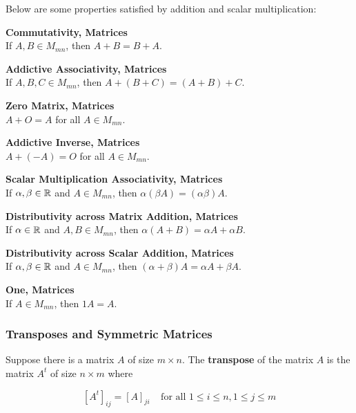 \documentclass[a4paper,12pt]{article}
\begin{document}
\begin{pst}
  Below are some properties satisfied by addition and scalar multiplication:

  \begin{alist}
    \item \textbf{Commutativity, Matrices}\\
    If $A,B\in M_{mn}$, then $A+B=B+A$.

    \item \textbf{Addictive Associativity, Matrices}\\
    If $A,B,C\in M_{mn}$, then $A+(B+C)=(A+B)+C$.

    \item \textbf{Zero Matrix, Matrices}\\
    $A+O=A$ for all $A\in M_{mn}$.

    \item \textbf{Addictive Inverse, Matrices}\\
    $A+(-A)=O$ for all $A\in M_{mn}$.

    \item \textbf{Scalar Multiplication Associativity, Matrices}\\
    If $\alpha,\beta\in\mathbb{R}$ and $A\in M_{mn}$, then $\alpha(\beta A)=(\alpha\beta)A$.

    \item \textbf{Distributivity across Matrix Addition, Matrices}\\
    If $\alpha\in\mathbb{R}$ and $A,B\in M_{mn}$, then $\alpha(A+B)=\alpha A+\alpha B$.

    \item \textbf{Distributivity across Scalar Addition, Matrices}\\
    If $\alpha,\beta\in\mathbb{R}$ and $A\in M_{mn}$, then $(\alpha+\beta)A=\alpha A+\beta A$.

    \item \textbf{One, Matrices}\\
    If $A\in M_{mn}$, then $1A=A$.
  \end{alist}
\end{pst}

\subsubsection{Transposes and Symmetric Matrices}
Suppose there is a matrix $A$ of size $m\times n$. The \textbf{transpose} of the matrix $A$ is the matrix $A^{t}$ of size $n\times m$ where

$$[A^{t}]_{ij}=[A]_{ji}\;\;\;\;\text{for all }1\leq i\leq n,1\leq j\leq m$$\s
\end{document}
